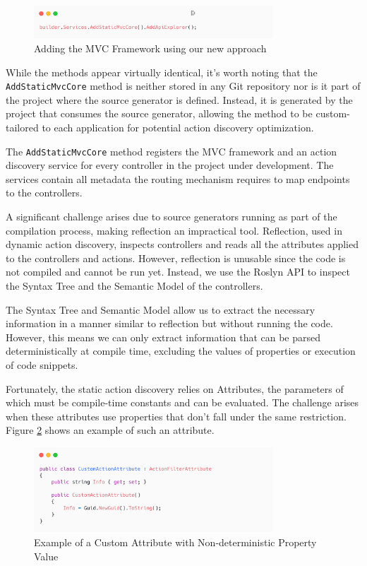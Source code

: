 \begin{figure}[H]
\centering
\includegraphics[width=0.8\textwidth]{graphics/static-action-discovery.png}
\caption{Adding the MVC Framework using our new approach}
\label{fig:static-action-discovery}
\end{figure}

While the methods appear virtually identical, it's worth noting that the \texttt{AddStaticMvcCore} method is neither stored in any Git repository nor is it part of the project where the source generator is defined. Instead, it is generated by the project that consumes the source generator, allowing the method to be custom-tailored to each application for potential action discovery optimization.

The \texttt{AddStaticMvcCore} method registers the MVC framework and an action discovery service for every controller in the project under development. The services contain all metadata the routing mechanism requires to map endpoints to the controllers.

A significant challenge arises due to source generators running as part of the compilation process, making reflection an impractical tool. Reflection, used in dynamic action discovery, inspects controllers and reads all the attributes applied to the controllers and actions. However, reflection is unusable since the code is not compiled and cannot be run yet. Instead, we use the Roslyn API to inspect the Syntax Tree and the Semantic Model of the controllers.

The Syntax Tree and Semantic Model allow us to extract the necessary information in a manner similar to reflection but without running the code. However, this means we can only extract information that can be parsed deterministically at compile time, excluding the values of properties or execution of code snippets.

Fortunately, the static action discovery relies on Attributes, the parameters of which must be compile-time constants and can be evaluated. The challenge arises when these attributes use properties that don't fall under the same restriction. Figure \ref{fig:custom-property} shows an example of such an attribute.

\begin{figure}[H]
\centering
\includegraphics[width=0.8\textwidth]{graphics/custom-property.png}
\caption{Example of a Custom Attribute with Non-deterministic Property Value}
\label{fig:custom-property}
\end{figure}

